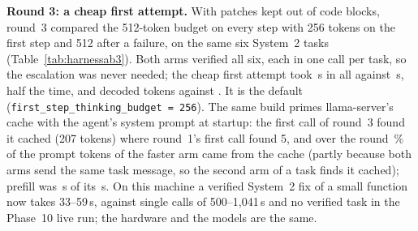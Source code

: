 \textbf{Round 3: a cheap first attempt.} With patches kept out of code blocks,
round~3 compared the 512-token budget on every step with 256 tokens on the
first step and 512 after a failure, on the same six System~2 tasks
(Table~\ref{tab:harnessab3}). Both arms verified all six, each in one call per
task, so the escalation was never needed; the cheap first attempt took
\HABRRTwoAdaptWall\,s in all against \HABRRTwoFixedWall\,s, half the time, and
decoded \HABRRTwoAdaptDecoded{} tokens against \HABRRTwoFixedDecoded. It is the
default (\texttt{first\_step\_thinking\_budget = 256}). The same build primes
llama-server's cache with the agent's system prompt at startup: the first call
of round~3 found it cached (207 tokens) where round~1's first call found 5, and
over the round \HABRRTwoAdaptHit\,\% of the prompt tokens of the faster arm came
from the cache (partly because both arms send the same task message, so the
second arm of a task finds it cached); prefill was \HABRRTwoAdaptPrefillS\,s of its
\HABRRTwoAdaptWall\,s. On this machine a verified System~2 fix of a small
function now takes 33--59\,s, against single calls of 500--1{,}041\,s and no
verified task in the Phase~10 live run; the hardware and the models are the same.
